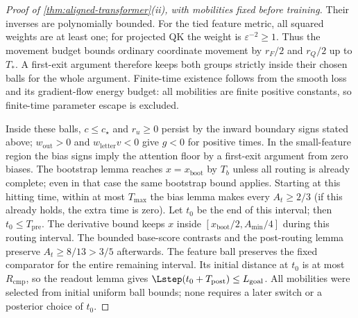 \begin{proof}[Proof of \cref{thm:aligned-transformer}(ii), with mobilities fixed before training]
Their inverses are polynomially bounded. For the tied feature metric,
all squared weights are at least one; for projected QK the weight is
$\varepsilon^{-2}\ge1$. Thus the movement budget bounds ordinary
coordinate movement by $r_F/2$ and $r_Q/2$ up to $T_*$.
A first-exit argument therefore keeps both groups strictly inside their
chosen balls for the whole argument. Finite-time existence follows from
the smooth loss and its gradient-flow energy budget: all mobilities are
finite positive constants, so finite-time parameter escape is excluded.

Inside these balls, $c\le c_\star$ and $r_u\ge0$ persist by the inward
boundary signs stated above; $w_{\mathrm{out}}>0$ and ${w_{\mathrm{letter}} v}<0$ give $g<0$ for positive
times. In the small-feature region the bias signs imply the attention
floor by a first-exit argument from zero biases. The bootstrap lemma
reaches $x=x_{\mathrm{boot}}$ by $T_b$ unless all routing is already complete;
even in that case the same bootstrap bound applies. Starting at this
hitting time, within at most $T_{\max}$ the bias lemma makes every
$A_t\ge2/3$ (if this already holds, the extra time is zero). Let $t_0$
be the end of this interval; then $t_0\le T_{\mathrm{pre}}$.
The derivative bound keeps $x$ inside $[x_{\mathrm{boot}}/2,A_{\min}/4]$ during
this routing interval. The bounded base-score contrasts and the
post-routing lemma preserve $A_t\ge8/13>3/5$ afterwards.
The feature ball preserves the fixed comparator for the entire remaining
interval. Its initial distance at $t_0$ is at most $R_{\mathrm{cmp}}$, so the readout
lemma gives $\Lstep(t_0+T_{\mathrm{post}})\le L_{\mathrm{goal}}$.
All mobilities were selected from initial uniform ball bounds; none
requires a later switch or a posterior choice of $t_0$.
\end{proof}

